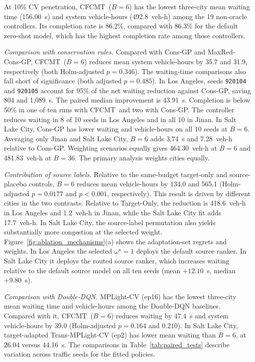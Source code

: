 \documentclass[letterpaper,journal]{IEEEtran}
\newcommand{\method}{CFCMT}
\begin{document}
At 10\% CV penetration, \method\ ($B=6$) has the lowest three-city mean waiting time (156.00~s) and system vehicle-hours (492.8~veh-h) among the 19 non-oracle controllers. Its completion rate is 86.2\%, compared with 86.3\% for the default zero-shot model, which has the highest completion rate among those controllers.

\textit{Comparison with conservation rules.} Compared with Cons-GP and MaxRed-Cons-GP, \method\ ($B=6$) reduces mean system vehicle-hours by 35.7 and 31.9, respectively (both Holm-adjusted $p=0.346$). The waiting-time comparisons also fall short of significance (both adjusted $p=0.485$). In Los Angeles, seeds \texttt{920104} and \texttt{920105} account for 95\% of the net waiting reduction against Cons-GP, saving 804 and 1,089~s. The paired median improvement is 43.91~s. Completion is below 50\% in one of ten runs with \method\ and two with Cons-GP. The controller reduces waiting in 8 of 10 seeds in Los Angeles and in all 10 in Jinan. In Salt Lake City, Cons-GP has lower waiting and vehicle-hours on all 10 seeds at $B=6$. Averaging only Jinan and Salt Lake City, $B=6$ adds 3.74~s and 7.28~veh-h relative to Cons-GP. Weighting scenarios equally gives 464.30~veh-h at $B=6$ and 481.83~veh-h at $B=36$. The primary analysis weights cities equally.

\textit{Contribution of source labels.} Relative to the same-budget target-only and source-placebo controls, $B=6$ reduces mean vehicle-hours by 134.0 and 565.1 (Holm-adjusted $p=0.0177$ and $p<0.001$, respectively). This result is driven by different cities in the two contrasts. Relative to Target-Only, the reduction is 418.6~veh-h in Los Angeles and 1.2~veh-h in Jinan, while the Salt Lake City fit adds 17.7~veh-h. In Salt Lake City, the source-label permutation also yields substantially more congestion at the selected weight. Figure~\ref{fig:ablation_mechanisms}(a) shows the adaptation-set regrets and weights. In Los Angeles the selected $\omega^\star=1$ deploys the default source ranker. In Salt Lake City it deploys the routed source ranker, which increases waiting relative to the default source model on all ten seeds (mean $+12.10$~s, median $+9.80$~s).

\textit{Comparison with Double-DQN.} MPLight-CV (ep16) has the lowest three-city mean waiting time and vehicle-hours among the Double-DQN baselines. Compared with it, \method\ ($B=6$) reduces waiting by 47.4~s and system vehicle-hours by 39.0 (Holm-adjusted $p=0.164$ and $0.210$). In Salt Lake City, target-adapted Trans-MPLight-CV (ep2) has lower mean waiting than $B=6$, at 26.04 versus 44.16~s. The comparisons in Table~\ref{tab:paired_tests} describe variation across traffic seeds for the fitted policies.
\end{document}
